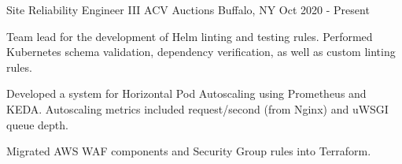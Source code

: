 
\begin{cventries}

  \cventry
    {Site Reliability Engineer III} %
    {ACV Auctions} %
    {Buffalo, NY} %
    {Oct 2020 - Present} %
    {
      \begin{cvitems} %
        \item {Team lead for the development of Helm linting and testing rules. Performed Kubernetes schema validation, dependency verification, as well as custom linting rules.}
        \item {Developed a system for Horizontal Pod Autoscaling using Prometheus and KEDA. Autoscaling metrics included request/second (from Nginx) and uWSGI queue depth.}
        \item {Migrated AWS WAF components and Security Group rules into Terraform.}
      \end{cvitems}
    }


\end{cventries}
